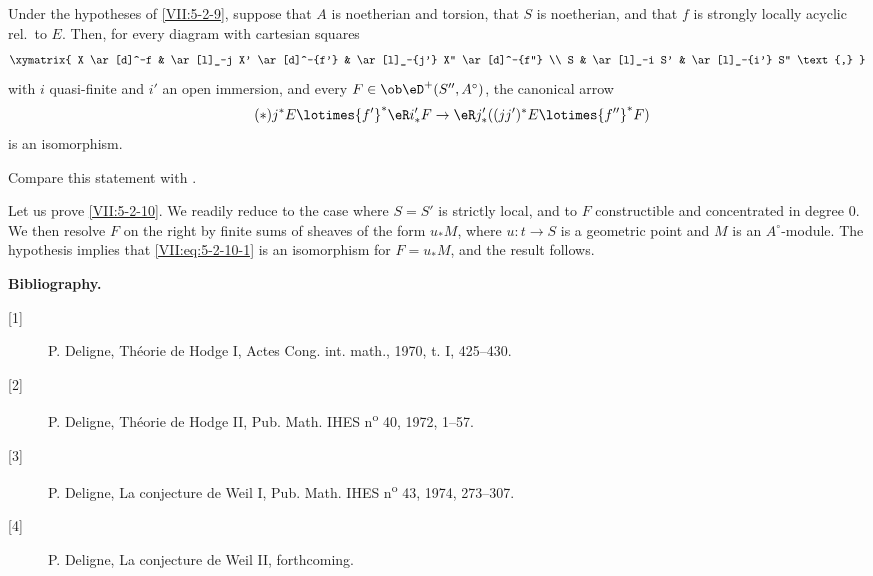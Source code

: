 \begin{proposition}\label{VII:5-2-10}
Under the hypotheses of \ref{VII:5-2-9}, suppose that $A$ is noetherian and
torsion, that $S$ is noetherian, and that $f$ is strongly locally acyclic
rel.\ to $E$. Then, for every diagram with cartesian squares
\[\xymatrix{
  X \ar[d]^-f 
    & \ar[l]_-j X' \ar[d]^-{f'} 
    & \ar[l]_-{j'} X'' \ar[d]^-{f''} \\
  S 
    & \ar[l]_-i S' 
    & \ar[l]_-{i'} S'' \text{,} 
}\]
with $i$ quasi-finite and $i'$ an open immersion, and every
$F\in\ob\eD^+(S'',A^\circ)$, the canonical arrow
\begin{equation*}\tag{$*$}\label{VII:eq:5-2-10-1}
  j^\ast E \lotimes {f'}^\ast \eR i'_\ast F \to \eR j'_\ast ((j j')^\ast E\lotimes {f''}^\ast F) 
\end{equation*}
is an isomorphism.
\end{proposition}

Compare this statement with \cite[XV 1.17]{sga4}.

Let us prove \ref{VII:5-2-10}. We readily reduce to the case where $S=S'$ is
strictly local, and to $F$ constructible and concentrated in degree $0$. We then
resolve $F$ on the right by finite sums of sheaves of the form $u_\ast M$,
where $u:t\to S$ is a geometric point and $M$ is an $A^\circ$-module. The
hypothesis implies that
\eqref{VII:eq:5-2-10-1} is an isomorphism for $F=u_\ast M$, and the result
follows.


\begin{center}\textbf{Bibliography.}\end{center}
\begin{description}
\item[{[1]}] P. Deligne, Théorie de Hodge I, Actes Cong. int. math., 1970, t. I, 425--430.
\item[{[2]}] P. Deligne, Théorie de Hodge II, Pub. Math. IHES n\textsuperscript{o} 40, 1972, 1--57.
\item[{[3]}] P. Deligne, La conjecture de Weil I, Pub. Math. IHES n\textsuperscript{o} 43, 1974, 273--307.
\item[{[4]}] P. Deligne, La conjecture de Weil II, forthcoming.
\end{description}
